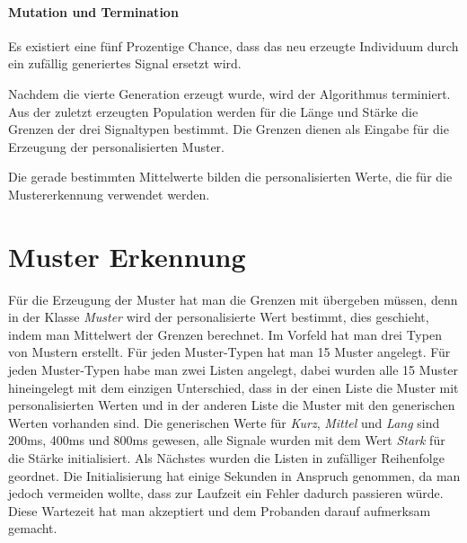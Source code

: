 \paragraph{Mutation und Termination}
Es existiert eine f{\"u}nf Prozentige Chance, dass das neu erzeugte Individuum durch ein zuf{\"a}llig generiertes Signal ersetzt wird. 

Nachdem die vierte Generation erzeugt wurde, wird der Algorithmus terminiert. Aus der zuletzt erzeugten Population werden f{\"u}r die L{\"a}nge und St{\"a}rke die Grenzen der drei Signaltypen bestimmt. Die Grenzen dienen als Eingabe f{\"u}r die Erzeugung der personalisierten Muster. 


Die gerade bestimmten Mittelwerte bilden die personalisierten Werte, die f{\"u}r die Mustererkennung verwendet werden. 

\section {Muster Erkennung}


F{\"u}r die Erzeugung der Muster hat man die Grenzen mit {\"u}bergeben m{\"u}ssen, denn in der Klasse \textit{Muster} wird der personalisierte Wert bestimmt, dies geschieht, indem man Mittelwert der Grenzen berechnet. 
Im Vorfeld hat man drei Typen von Mustern erstellt. F{\"u}r jeden Muster-Typen hat man 15 Muster angelegt. 
F{\"u}r jeden Muster-Typen habe man zwei Listen angelegt, dabei wurden alle 15 Muster hineingelegt mit dem einzigen Unterschied, dass in der einen Liste die Muster mit personalisierten Werten und in der anderen Liste die Muster mit den generischen Werten vorhanden sind.
Die generischen Werte f{\"u}r \textit{Kurz}, \textit{Mittel} und \textit{Lang} sind 200ms, 400ms und 800ms gewesen, alle Signale wurden mit dem Wert \textit{Stark} f{\"u}r die St{\"a}rke initialisiert.
Als N{\"a}chstes wurden die Listen in zuf{\"a}lliger Reihenfolge geordnet. 
Die Initialisierung hat einige Sekunden in Anspruch genommen, da man jedoch vermeiden wollte, dass zur Laufzeit ein Fehler dadurch passieren w{\"u}rde. Diese Wartezeit hat man akzeptiert und dem Probanden darauf aufmerksam gemacht.

